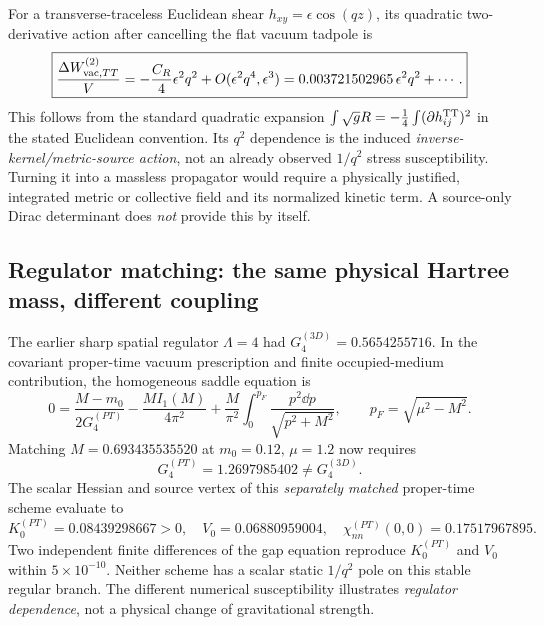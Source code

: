 \documentclass[11pt,a4paper]{article}
\begin{document}
For a transverse-traceless Euclidean shear $h_{xy}=\epsilon\cos(qz)$, its quadratic two-derivative action after cancelling the flat vacuum tadpole is
\begin{equation}\label{eq:qm007-TTq2}
\boxed{\frac{\Delta W_{{\rm vac},TT}^{(2)}}{V}
 =-\frac{C_R}{4}\epsilon^2q^2+O(\epsilon^2q^4,\epsilon^3)
 =0.003721502965\,\epsilon^2q^2+\cdots.}
\end{equation}
This follows from the standard quadratic expansion $\int\sqrt g R=-\frac14\int(\partial h_{ij}^{\rm TT})^2$ in the stated Euclidean convention. Its $q^2$ dependence is the induced \emph{inverse-kernel/metric-source action}, not an already observed $1/q^2$ stress susceptibility. Turning it into a massless propagator would require a physically justified, integrated metric or collective field and its normalized kinetic term. A source-only Dirac determinant does \emph{not} provide this by itself.

\subsection{Regulator matching: the same physical Hartree mass, different coupling}
The earlier sharp spatial regulator $\Lambda=4$ had $G_4^{(3D)}=0.5654255716$. In the covariant proper-time vacuum prescription and finite occupied-medium contribution, the homogeneous saddle equation is
\begin{equation}\label{eq:qm007-gap}
0=\frac{M-m_0}{2G_4^{(PT)}}-\frac{M I_1(M)}{4\pi^2}
+\frac{M}{\pi^2}\int_0^{p_F}\frac{p^2\dd p}{\sqrt{p^2+M^2}},\qquad p_F=\sqrt{\mu^2-M^2}.
\end{equation}
Matching $M=0.693435535520$ at $m_0=0.12,\,\mu=1.2$ now requires
\begin{equation}\label{eq:qm007-Gpt}
\boxed{G_4^{(PT)}=1.2697985402\ne G_4^{(3D)}.}
\end{equation}
The scalar Hessian and source vertex of this \emph{separately matched} proper-time scheme evaluate to
\begin{equation}\label{eq:qm007-PTresponse}
\boxed{K_0^{(PT)}=0.08439298667>0,\quad V_0=0.06880959004,\quad
 \chi_{nn}^{(PT)}(0,0)=0.17517967895.}
\end{equation}
Two independent finite differences of the gap equation reproduce $K_0^{(PT)}$ and $V_0$ within $5\times10^{-10}$. Neither scheme has a scalar static $1/q^2$ pole on this stable regular branch. The different numerical susceptibility illustrates \emph{regulator dependence}, not a physical change of gravitational strength.
\end{document}
